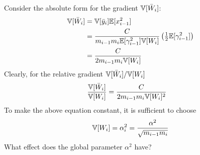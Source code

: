 Consider the absolute form for the gradient $\mathbb{V}[\bar{W}_{i}]$:
\begin{align}
\mathbb{V}[\bar{W}_{i}] & = \mathbb{V}[\bar{y}_{i}] \mathbb{E}[x_{i-1}^2] \\
& = \frac{C}{m_{i-1} m_{i} \mathbb{E}[\gamma_{i-1}^2] \mathbb{V}[W_{i}]}
  \left( \tfrac{1}{2} \mathbb{E}[\gamma_{i-1}^2] \right) \\
& = \frac{C}{2 m_{i-1} m_{i} \mathbb{V}[W_{i}]}
\end{align}
Clearly, for the relative gradient $\mathbb{V}[\bar{W}_{i}] / \mathbb{V}[W_{i}]$
\begin{align}
\frac{\mathbb{V}[\bar{W}_{i}]}{\mathbb{V}[W_{i}]} & = \frac{C}{2 m_{i-1} m_{i} \mathbb{V}[W_{i}]^2}
\end{align}
To make the above equation constant, it is sufficient to choose
\begin{align}
\mathbb{V}[W_{i}] = \alpha_{i}^2 = \frac{\alpha^2}{\sqrt{m_{i-1} m_{i}}}
\end{align}
What effect does the global parameter $\alpha^2$ have?
